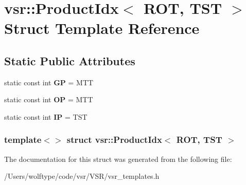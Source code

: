 \hypertarget{structvsr_1_1_product_idx_3_01_r_o_t_00_01_t_s_t_01_4}{\section{vsr\-:\-:Product\-Idx$<$ R\-O\-T, T\-S\-T $>$ Struct Template Reference}
\label{structvsr_1_1_product_idx_3_01_r_o_t_00_01_t_s_t_01_4}
}
\subsection*{Static Public Attributes}
\begin{DoxyCompactItemize}
\item 
\hypertarget{structvsr_1_1_product_idx_3_01_r_o_t_00_01_t_s_t_01_4_a9a3aac81947a0ca19d9a9f5e6c424c57}{static const int {\bfseries G\-P} = M\-T\-T}\label{structvsr_1_1_product_idx_3_01_r_o_t_00_01_t_s_t_01_4_a9a3aac81947a0ca19d9a9f5e6c424c57}

\item 
\hypertarget{structvsr_1_1_product_idx_3_01_r_o_t_00_01_t_s_t_01_4_ae638da2058ee7b7ca987c07a00ad12a5}{static const int {\bfseries O\-P} = M\-T\-T}\label{structvsr_1_1_product_idx_3_01_r_o_t_00_01_t_s_t_01_4_ae638da2058ee7b7ca987c07a00ad12a5}

\item 
\hypertarget{structvsr_1_1_product_idx_3_01_r_o_t_00_01_t_s_t_01_4_a6ecdfc0b4e810eca21a8751efa4b0050}{static const int {\bfseries I\-P} = T\-S\-T}\label{structvsr_1_1_product_idx_3_01_r_o_t_00_01_t_s_t_01_4_a6ecdfc0b4e810eca21a8751efa4b0050}

\end{DoxyCompactItemize}
\subsubsection*{template$<$$>$ struct vsr\-::\-Product\-Idx$<$ R\-O\-T, T\-S\-T $>$}



The documentation for this struct was generated from the following file\-:\begin{DoxyCompactItemize}
\item 
/\-Users/wolftype/code/vsr/\-V\-S\-R/vsr\-\_\-templates.\-h\end{DoxyCompactItemize}
